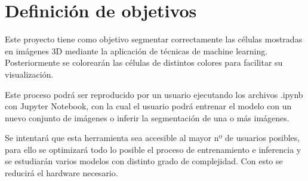 \chapter{Definici\'on de objetivos}\label{defobjetivos}

Este proyecto tiene como objetivo segmentar correctamente las células mostradas en imágenes 3D mediante la aplicación de técnicas de machine learning. Posteriormente se colorearán las células de distintos colores para facilitar su visualización. 

Este proceso podrá ser reproducido por un usuario ejecutando los archivos .ipynb con Jupyter Notebook, con la cual el usuario podrá entrenar el modelo con un nuevo conjunto de imágenes o inferir la segmentación de una o más imágenes.

Se intentará que esta herramienta sea accesible al mayor nº de usuarios posibles, para ello se optimizará todo lo posible el proceso de entrenamiento e inferencia y se estudiarán varios modelos con distinto grado de complejidad. Con esto se reducirá el hardware necesario.